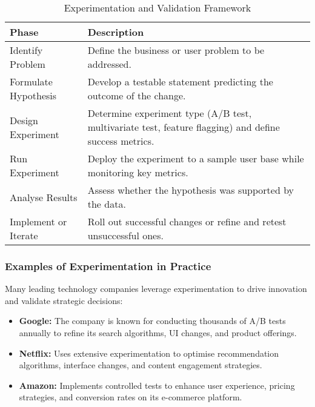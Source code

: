 \begin{table}[h]
    \centering
    \begin{tabular}{|l|l|}
        \hline
        \textbf{Phase}       & \textbf{Description}                                                                                  \\
        \hline
        Identify Problem     & Define the business or user problem to be addressed.                                                  \\
        \hline
        Formulate Hypothesis & Develop a testable statement predicting the outcome of the change.                                    \\
        \hline
        Design Experiment    & Determine experiment type (A/B test, multivariate test, feature flagging) and define success metrics. \\
        \hline
        Run Experiment       & Deploy the experiment to a sample user base while monitoring key metrics.                             \\
        \hline
        Analyse Results      & Assess whether the hypothesis was supported by the data.                                              \\
        \hline
        Implement or Iterate & Roll out successful changes or refine and retest unsuccessful ones.                                   \\
        \hline
    \end{tabular}
    \caption{Experimentation and Validation Framework}
\end{table}

\subsubsection{Examples of Experimentation in Practice}
Many leading technology companies leverage experimentation to drive innovation and validate strategic decisions:

\begin{itemize}
    \item \textbf{Google:} The company is known for conducting thousands of A/B tests annually to refine its search algorithms, UI changes, and product offerings.
    \item \textbf{Netflix:} Uses extensive experimentation to optimise recommendation algorithms, interface changes, and content engagement strategies.
    \item \textbf{Amazon:} Implements controlled tests to enhance user experience, pricing strategies, and conversion rates on its e-commerce platform.
\end{itemize}

